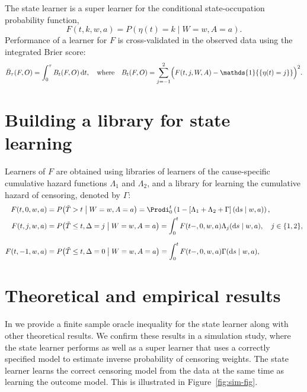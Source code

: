 \documentclass[a0,portrait]{a0poster}
\newcommand*\diff{\mathop{}\!\mathrm{d}}
\newcommand{\midd}{\; \middle|\;}
\newcommand{\1}{\mathds{1}}
\begin{document}
\begin{minipage}{\textwidth}
\begin{minipage}[t]{1\linewidth}
\begin{multicols}{2}
\vspace{1cm}

The state learner is a super learner for the conditional state-occupation
probability function, 
\begin{equation*}
  F(t, k, w,a) = P(\eta(t) = k \mid W=w, A=a).
\end{equation*}
Performance of a learner for \( F \) is cross-validated in the
observed data using the integrated Brier score:
\begin{equation*}
  \bar B_\tau( F,O) = \int_0^{\tau} B_t(F,O) \diff t,
  \quad \text{where} \quad 
  B_t(F,O) = \sum_{j=-1}^{2}
  \Bigl(
    F(t,j,W,A) - \1{\{\eta(t)=j\}}
  \Bigr)^2.
\end{equation*}

\section*{Building a library for state learning}

Learners of \( F \) are obtained using libraries of learners of the
cause-specific cumulative hazard functions \( \Lambda_{1} \) and
\( \Lambda_{2} \), and a library for learning the cumulative hazard of
censoring, denoted by $\Gamma$:
\begin{align*}
  F(t, 0, w,a)
  &= P{\left( \tilde{T}>t \midd W=w,A=a \right)}
    = \Prodi_0^t
    \left( 1 - 
    \left[\Lambda_{1} + \Lambda_{2} + \Gamma
    \right](\diff s \mid w,a) \right),
  \\
  F(t, j, w,a)
  & = P{\left(
    \tilde{T} \leq t, \Delta=j \midd W=w, A=a
    \right)}
    = \int_0^t F(t-,0, w,a)  \Lambda_{j}(\diff s \mid w,a),
    \quad  j \in \{1,2\},
  \\[.7em]
  F(t, -1, w,a)
  & =
    P{\left( \tilde{T} \leq t, \Delta=0 \midd W=w, A=a \right)}
    = \int_0^tF(t-,0, w,a)  \Gamma(\diff s \mid w,a),
\end{align*}

  \section*{Theoretical and empirical results}
  \vspace{-.7em}
  \setlength{\columnseprule}{0pt} \setlength{\columnsep}{30pt}
\begin{multicols}{2}
  In \cite{munch2024} we provide a finite sample oracle inequality for the state
  learner along with other theoretical results. We confirm these results in a
  simulation study, where the state learner performs as well as a super learner
  that uses a correctly specified model to estimate inverse probability of
  censoring weights. The state learner learns the correct censoring model from
  the data at the same time as learning the outcome model. This is illustrated
  in Figure~\ref{fig:sim-fig}.


\end{multicols}
\end{multicols}
\end{minipage}
\end{minipage}
\end{document}
